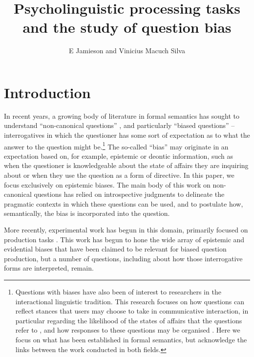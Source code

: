 \documentclass[output=paper,colorlinks,citecolor=brown]{langscibook}
\author{E Jamieson\affiliation{University of York}\orcid{0000-0001-8679-3360} and Vinicius Macuch Silva\orcid{0000-0002-3370-4157}\affiliation{Goethe University Frankfurt}}
\title{Psycholinguistic processing tasks and the study of question bias}
\begin{document}
\maketitle

\section{Introduction}

In recent years, a growing body of literature in formal semantics has sought to understand ``non-canonical questions'' \citep{dayal_questions_2017}, and particularly ``biased questions''  --  interrogatives in which the questioner has some sort of expectation as to what the answer to the question might be.\footnote{Questions with biases have also been of interest to researchers in the interactional linguistic tradition. This research focuses on how questions can reflect stances that users may choose to take in communicative interaction, in particular regarding the likelihood of the states of affairs that the questions refer to \citep[e.g.][]{heritage2021preference, raymond2021probability}, and how responses to these questions may be organised \citep[e.g.][]{heritage2012epistemics, lee2015two}. Here we focus on what has been established in formal semantics, but acknowledge the links between the work conducted in both fields.} The so-called ``bias'' may originate in an expectation based on, for example, epistemic or deontic information, such as when the questioner is knowledgeable about the state of affairs they are inquiring about or when they use the question as a form of directive. In this paper, we focus exclusively on epistemic biases. The main body of this work on non-canonical questions has relied on introspective judgments to delineate the pragmatic contexts in which these questions can be used, and to postulate how, semantically, the bias is incorporated into the question.

More recently, experimental work has begun in this domain, primarily focused on production tasks \citep{domaneschi_bias_2017}.  This work has begun to hone the wide array of epistemic and evidential biases that have been claimed to be relevant for biased question production, but a number of questions, including about how those interrogative forms are interpreted, remain.
\end{document}
